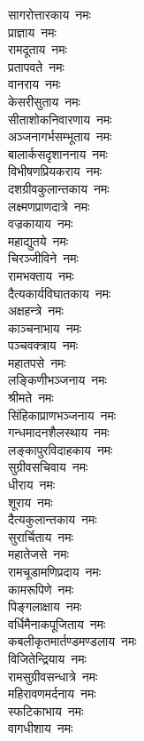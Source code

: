 \begin{multicols}{2}
\begin{flushleft}
सागरोत्तारकाय~नमः\\
प्राज्ञाय~नमः\hfill{}\\
रामदूताय~नमः\\
प्रतापवते~नमः\\
वानराय~नमः\\
केसरीसुताय~नमः\\
सीताशोकनिवारणाय~नमः\\
अञ्जनागर्भसम्भूताय~नमः\\
बालार्कसदृशाननाय~नमः\\
विभीषणप्रियकराय~नमः\\
दशग्रीवकुलान्तकाय~नमः\\
लक्ष्मणप्राणदात्रे~नमः\hfill{}\\
वज्रकायाय~नमः\\
महाद्युतये~नमः\\
चिरञ्जीविने~नमः\\
रामभक्ताय~नमः\\
दैत्यकार्यविघातकाय~नमः\\
अक्षहन्त्रे~नमः\\
काञ्चनाभाय~नमः\\
पञ्चवक्त्राय~नमः\\
महातपसे~नमः\\
लङ्किणीभञ्जनाय~नमः\hfill{}\\
श्रीमते~नमः\\
सिंहिकाप्राणभञ्जनाय~नमः\\
गन्धमादनशैलस्थाय~नमः\\
लङ्कापुरविदाहकाय~नमः\\
सुग्रीवसचिवाय~नमः\\
धीराय~नमः\\
शूराय~नमः\\
दैत्यकुलान्तकाय~नमः\\
सुरार्चिताय~नमः\\
महातेजसे~नमः\hfill{}\\
रामचूडामणिप्रदाय~नमः\\
कामरूपिणे~नमः\\
पिङ्गलाक्षाय~नमः\\
वर्धिमैनाकपूजिताय~नमः\\
कबलीकृत\-मार्तण्डमण्डलाय~नमः\\
विजितेन्द्रियाय~नमः\\
रामसुग्रीवसन्धात्रे~नमः\\
महिरावणमर्दनाय~नमः\\
स्फटिकाभाय~नमः\\
वागधीशाय~नमः\hfill{}\\

\end{flushleft}
\end{multicols}
